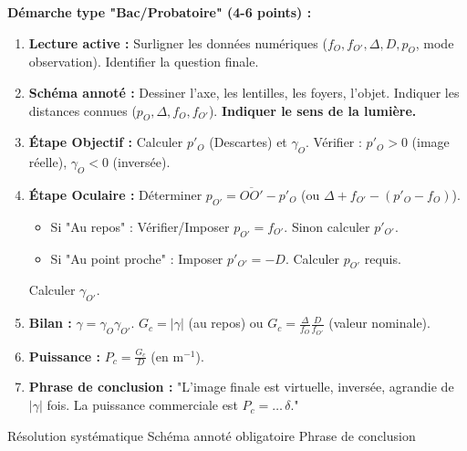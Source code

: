 \documentclass[11pt]{article}
\newcommand{\cle}[1]{{\popxbold\color{popdark}#1}}
\begin{document}
\begin{methode}
\textbf{Démarche type "Bac/Probatoire" (4-6 points) :}
\begin{enumerate}
    \item \textbf{Lecture active :} Surligner les données numériques ($f_O, f_{O'}, \Delta, D, p_O$, mode observation). Identifier la question finale.
    \item \textbf{Schéma annoté :} Dessiner l'axe, les lentilles, les foyers, l'objet. Indiquer les distances connues ($p_O, \Delta, f_O, f_{O'}$). \textbf{Indiquer le sens de la lumière.}
    \item \textbf{Étape Objectif :} Calculer $p'_O$ (Descartes) et $\gamma_O$. Vérifier : $p'_O > 0$ (image réelle), $\gamma_O < 0$ (inversée).
    \item \textbf{Étape Oculaire :} Déterminer $p_{O'} = \overline{OO'} - p'_O$ (ou $\Delta + f_{O'} - (p'_O - f_O)$).
        \begin{itemize}
            \item Si "Au repos" : Vérifier/Imposer $p_{O'} = f_{O'}$. Sinon calculer $p'_{O'}$.
            \item Si "Au point proche" : Imposer $p'_{O'} = -D$. Calculer $p_{O'}$ requis.
        \end{itemize}
        Calculer $\gamma_{O'}$.
    \item \textbf{Bilan :} $\gamma = \gamma_O \gamma_{O'}$. $G_c = |\gamma|$ (au repos) ou $G_c = \frac{\Delta}{f_O}\frac{D}{f_{O'}}$ (valeur nominale).
    \item \textbf{Puissance :} $P_c = \frac{G_c}{D}$ (en m$^{-1}$).
    \item \textbf{Phrase de conclusion :} "L'image finale est virtuelle, inversée, agrandie de $|\gamma|$ fois. La puissance commerciale est $P_c = \dots\,\delta$."
\end{enumerate}
\cle{Résolution systématique} \cle{Schéma annoté obligatoire} \cle{Phrase de conclusion}
\end{methode}
\end{document}
